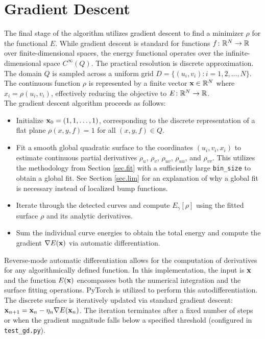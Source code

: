\documentclass{article}
\newcommand{\grad}{\nabla}
\begin{document}
\section{Gradient Descent}\label{sec.gd}
The final stage of the algorithm utilizes gradient descent to find a minimizer $\rho$ for the functional $E$. While gradient descent is standard for functions $f \colon \mathbb{R}^N \to \mathbb{R}$ over finite-dimensional spaces, the energy functional operates over the infinite-dimensional space $C^\infty(Q)$. The practical resolution is discrete approximation. The domain $Q$ is sampled across a uniform grid $D = \{(u_i, v_i)\colon i = 1, 2, \dots, N\}$. The continuous function $\rho$ is represented by a finite vector $\mathbf{x} \in \mathbb{R}^N$ where $x_i = \rho(u_i, v_i)$, effectively reducing the objective to $E \colon \mathbb{R}^N \to \mathbb{R}$. \\

The gradient descent algorithm proceeds as follows:
\begin{itemize}
  \item Initialize $\mathbf{x}_0 = (1, 1, \dots, 1)$, corresponding to the discrete representation of a flat plane $\rho(x, y, f) = 1$ for all $(x, y, f) \in Q$.
  \item Fit a smooth global quadratic surface to the coordinates $(u_i, v_i, x_i)$ to estimate continuous partial derivatives $\rho_u$, $\rho_v$, $\rho_{uv}$, $\rho_{uu}$, and $\rho_{vv}$. This utilizes the methodology from Section \ref{sec.fit} with a sufficiently large \verb|bin_size| to obtain a global fit. See Section \ref{sec.lim} for an explanation of why a global fit is necessary instead of localized bump functions.
  \item Iterate through the detected curves and compute $E_\gamma[\rho]$ using the fitted surface $\rho$ and its analytic derivatives.
  \item Sum the individual curve energies to obtain the total energy and compute the gradient $\grad E(\vect x)$ via automatic differentiation.
\end{itemize}
Reverse-mode automatic differentiation allows for the computation of derivatives for any algorithmically defined function. In this implementation, the input is $\mathbf{x}$ and the function $E(\mathbf{x})$ encompasses both the numerical integration and the surface fitting operations. PyTorch is utilized to perform this autodifferentiation. The discrete surface is iteratively updated via standard gradient descent: $\vect x_{n+1} = \vect x_n - \eta_n\grad E(\vect x_n)$. The iteration terminates after a fixed number of steps or when the gradient magnitude falls below a specified threshold (configured in \verb|test_gd.py|). \\
\end{document}
